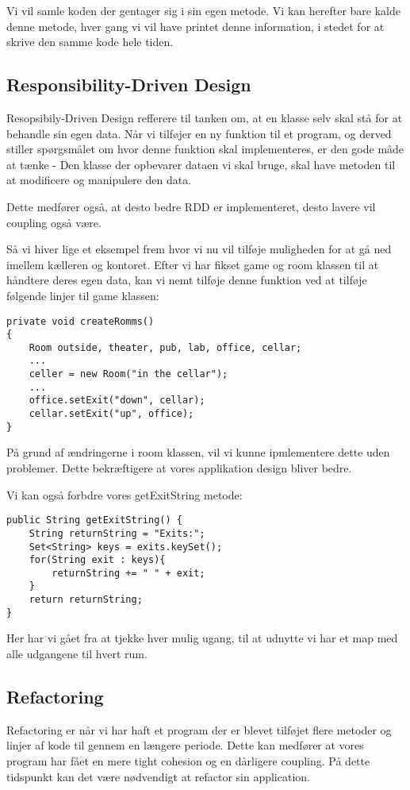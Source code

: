 \documentclass{article}
\begin{document}
Vi vil samle koden der gentager sig i sin egen metode. Vi kan herefter bare kalde denne metode, hver gang vi vil have printet denne information, i stedet for at skrive den samme kode hele tiden.

\subsection*{Responsibility-Driven Design}
Resopsibily-Driven Design refferere til tanken om, at en klasse selv skal stå for at behandle sin egen data. 
Når vi tilføjer en ny funktion til et program, og derved stiller spørgsmålet om hvor denne funktion skal implementeres, er den gode måde at tænke - Den klasse der opbevarer dataen vi skal bruge, skal have metoden til at modificere og manipulere den data.

Dette medfører også, at desto bedre RDD er implementeret, desto lavere vil coupling også være.

Så vi hiver lige et eksempel frem hvor vi nu vil tilføje muligheden for at gå ned imellem kælleren og kontoret. 
Efter vi har fikset game og room klassen til at håndtere deres egen data, kan vi nemt tilføje denne funktion ved at tilføje følgende linjer til game klassen:
\begin{verbatim}
private void createRomms()
{
	Room outside, theater, pub, lab, office, cellar;
	...
	celler = new Room("in the cellar");
	...
	office.setExit("down", cellar);
	cellar.setExit("up", office);
}
\end{verbatim}
På grund af ændringerne i room klassen, vil vi kunne ipmlementere dette uden problemer. Dette bekræftigere at vores applikation design bliver bedre.

Vi kan også forbdre vores getExitString metode:
\begin{verbatim}
public String getExitString() {
	String returnString = "Exits:";
	Set<String> keys = exits.keySet();
	for(String exit : keys){
		returnString += " " + exit;
	}
	return returnString;
}
\end{verbatim}
Her har vi gået fra at tjekke hver mulig ugang, til at udnytte vi har et map med alle udgangene til hvert rum. 

\subsection*{Refactoring}
Refactoring er når vi har haft et program der er blevet tilføjet flere metoder og linjer af kode til gennem en længere periode. Dette kan medfører at vores program har fået en mere tight cohesion og en dårligere coupling. På dette tidspunkt kan det være nødvendigt at refactor sin application.
\end{document}
